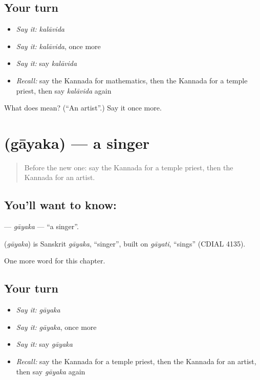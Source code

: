 \subsection*{Your turn}
\begin{itemize}
\raggedright
  \item \emph{Say it:} \emph{kalāvida}
  \item \emph{Say it:} \emph{kalāvida}, once more
  \item \emph{Say it:} say \emph{kalāvida}
  \item \emph{Recall:} say the Kannada for mathematics, then the Kannada for a temple priest, then say \emph{kalāvida} again
\end{itemize}

\begin{tcolorbox}[breakable,colback=teal!4,colframe=teal!35!black,title={Before you move on}]
What does  mean? (\textquotedblleft{}An artist\textquotedblright{}.) Say it once more.
\end{tcolorbox}
\section[\texorpdfstring{\kn{ಗಾಯಕ} (gāyaka)}{ಗಾಯಕ (gāyaka)}]{ (gāyaka) — a singer}

\label{lesson:KA-C305-gayaka}



\begin{quote}
Before the new one: say the Kannada for a temple priest, then the Kannada for an artist.
\end{quote}

\subsection*{You'll want to know: }
\textbf{} — \emph{gāyaka} — \textquotedblleft{}a singer\textquotedblright{}.

\begin{cousinweb}
\textbf{} (\emph{gāyaka}) is Sanskrit \emph{gāyaka}, \textquotedblleft{}singer\textquotedblright{}, built on \emph{gāyati}, \textquotedblleft{}sings\textquotedblright{} (CDIAL 4135).
\end{cousinweb}

\begin{grammarlens}[title={What you've built}]
One more word for this chapter.
\end{grammarlens}

\subsection*{Your turn}
\begin{itemize}
\raggedright
  \item \emph{Say it:} \emph{gāyaka}
  \item \emph{Say it:} \emph{gāyaka}, once more
  \item \emph{Say it:} say \emph{gāyaka}
  \item \emph{Recall:} say the Kannada for a temple priest, then the Kannada for an artist, then say \emph{gāyaka} again
\end{itemize}

